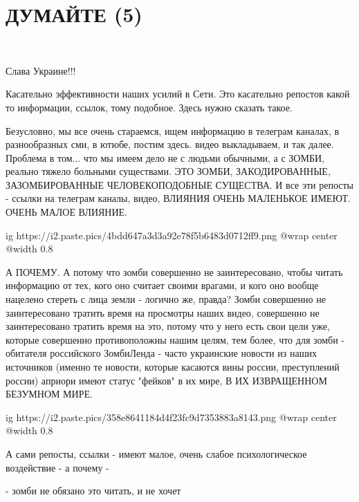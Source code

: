  
 
 
 
 

\section{ДУМАЙТЕ (5)}

💛 💙 💛 💙 💛 💙 💛 💙 💛 💙 💛 💙            

Слава Украине!!! 

Касательно эффективности наших усилий в Сети. Это касательно репостов какой то
информации, ссылок, тому подобное. Здесь нужно сказать такое.

Безусловно, мы все очень стараемся, ищем информацию в телеграм каналах, в
разнообразных сми, в ютюбе, постим здесь. видео выкладываем, и так далее.
Проблема в том...  что мы имеем дело не с людьми обычными, а с ЗОМБИ, реально
тяжело больными существами. ЭТО ЗОМБИ, ЗАКОДИРОВАННЫЕ, ЗАЗОМБИРОВАННЫЕ
ЧЕЛОВЕКОПОДОБНЫЕ СУЩЕСТВА. И все эти репосты - ссылки на телеграм каналы,
видео, ВЛИЯНИЯ ОЧЕНЬ МАЛЕНЬКОЕ ИМЕЮТ. ОЧЕНЬ МАЛОЕ ВЛИЯНИЕ.

\ifcmt
  ig https://i2.paste.pics/4bdd647a3d3a92e78f5b6483d0712ff9.png
  @wrap center
  @width 0.8
\fi

А ПОЧЕМУ. А потому что зомби совершенно не заинтересовано, чтобы читать
информацию от тех, кого оно считает своими врагами, и кого оно вообще нацелено
стереть с лица земли - логично же, правда? Зомби совершенно не заинтересовано
тратить время на просмотры наших видео, совершенно не заинтересовано тратить
время на это, потому что у него есть свои цели уже, которые совершенно
противоположны нашим целям, тем более, что для зомби - обитателя российского
ЗомбиЛенда - часто украинские новости из наших источников (именно те новости,
которые касаются вины россии, преступлений россии) априори имеют статус
"фейков" в их мире, В ИХ ИЗВРАЩЕННОМ БЕЗУМНОМ МИРЕ. 

\ifcmt
  ig https://i2.paste.pics/358e8641184d4f23fc9d7353883a8143.png
  @wrap center
  @width 0.8
\fi

А сами репосты, ссылки - имеют малое, очень слабое психологическое воздействие
- а почему - 

- зомби не обязано это читать, и не хочет


